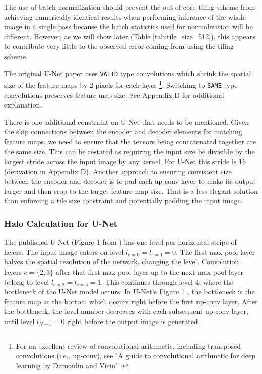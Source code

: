 \documentclass[runningheads]{llncs}
\begin{document}
The use of batch normalization should prevent the out-of-core tiling scheme from achieving numerically identical results when performing inference of the whole image in a single pass because the batch statistics used for normalization will be different. However, as we will show later (Table \ref{tab:tile_size_512}), this appears to contribute very little to the observed error coming from using the tiling scheme.

The original U-Net paper uses \texttt{VALID} type convolutions which shrink the spatial size of the feature maps by 2 pixels for each layer \cite{Dumoulin2018}\footnote{For an excellent review of convolutional arithmetic, including transposed convolutions (i.e., up-conv), see "A guide to convolutional arithmetic for deep learning by Dumoulin and Visin" \cite{Dumoulin2018}.}. Switching to \texttt{SAME} type convolutions preserves feature map size. See Appendix D for additional explanation. 

There is one additional constraint on U-Net that needs to be mentioned. Given the skip connections between the encoder and decoder elements for matching feature maps, we need to ensure that the tensors being concatenated together are the same size. This can be restated as requiring the input size be divisible by the largest stride across the input image by any kernel. For U-Net this stride is $16$ (derivation in Appendix D). Another approach to ensuring consistent size between the encoder and decoder is to pad each up-conv layer to make its output larger and then crop to the target feature map size. That is a less elegant solution than enforcing a tile size constraint and potentially padding the input image.


\subsubsection{Halo Calculation for U-Net}

The published U-Net (Figure 1 from \cite{Ronneberger2015a}) has one level per horizontal stripe of layers. The input image enters on level $l_{c=0} = l_{c=1} = 0$. The first max-pool layer halves the spatial resolution of the network, changing the level. Convolution layers $c = \{2, 3\}$ after that first max-pool layer up to the next max-pool layer belong to level $l_{c=2}=l_{c=3} = 1$. This continues through level 4, where the bottleneck of the U-Net model occurs. In U-Net's Figure 1 \cite{Ronneberger2015a}, the bottleneck is the feature map at the bottom which occurs right before the first up-conv layer. After the bottleneck, the level number decreases with each subsequent up-conv layer, until level $l_{N-1} = 0$ right before the output image is generated. 
\end{document}
